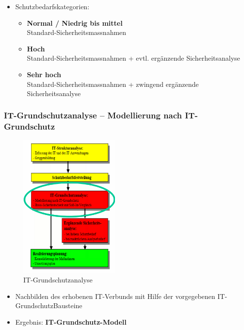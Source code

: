 \documentclass[10pt,a4paper]{article}
\begin{document}
\begin{itemize}[noitemsep,topsep=0pt,leftmargin=*]
    \item Schutzbedarfskategorien:
    \begin{itemize}[noitemsep,topsep=0pt,leftmargin=*]
        \item \textbf{Normal / Niedrig bis mittel}\\
        Standard-Sicherheitsmassnahmen
        \item \textbf{Hoch}\\
        Standard-Sicherheitsmassnahmen + evtl. ergänzende
        Sicherheitsanalyse
        \item \textbf{Sehr hoch}\\
        Standard-Sicherheitsmassnahmen + zwingend
        ergänzende Sicherheitsanalyse
    \end{itemize}
\end{itemize}

\subsubsection*{IT-Grundschutzanalyse – Modellierung nach IT-Grundschutz}
\begin{figure}[H]
    \begin{center}
    \includegraphics[width=5cm]{images/IT-Grundschutzanalyse.png}
    \caption{IT-Grundschutzanalyse}
    \label{IT-Grundschutzanalyse}
    \end{center}
\end{figure}

\begin{itemize}[noitemsep,topsep=0pt,leftmargin=*]
    \item Nachbilden des erhobenen IT-Verbunds mit
    Hilfe der vorgegebenen IT-GrundschutzBausteine
    \item Ergebnis: \textbf{IT-Grundschutz-Modell}
\end{itemize}
\end{document}
